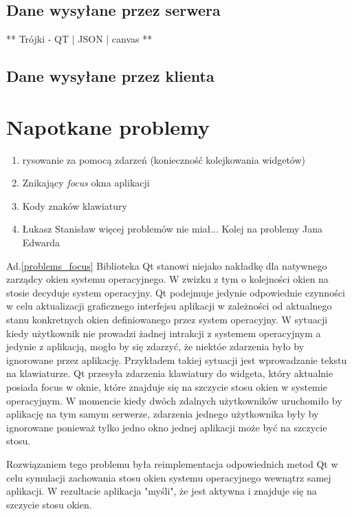 \documentclass[polish]{inz}
\begin{document}
\subsection{Dane wysyłane przez serwera}

** Trójki - QT | JSON | canvas **

\subsection{Dane wysyłane przez klienta}

\section{Napotkane problemy}
\begin{enumerate}
  \item rysowanie za pomocą zdarzeń (konieczność kolejkowania widgetów)
  \item Znikający \emph{focus} okna aplikacji
  \label{problems_focus}
  \item Kody znaków klawiatury
  \label{problems_keyboard}
  \item Łukasz Stanisław więcej problemów nie miał... Kolej na problemy Jana Edwarda
\end{enumerate}

Ad.\ref{problems_focus} Biblioteka Qt stanowi niejako nakładkę dla natywnego zarządcy okien systemu operacyjnego. W zwizku z tym o kolejności okien na stosie decyduje system operacyjny. Qt podejmuje jedynie odpowiednie czynności w celu aktualizacji graficznego interfejsu aplikacji w zależności od aktualnego stanu konkretnych okien definiowanego przez system operacyjny. W sytuacji kiedy użytkownik nie prowadzi żadnej intrakcji z systemem operacyjnym a jedynie z aplikacją, mogło by się zdarzyć, że niektóe zdarzenia było by ignorowane przez aplikację. Przykładem takiej sytuacji jest wprowadzanie tekstu na klawiaturze. Qt przesyła zdarzenia klawiatury do widgeta, który aktualnie posiada focus w oknie, które znajduje się na szczycie stosu okien w systemie operacyjnym. W momencie kiedy dwóch zdalnych użytkowników uruchomiło by aplikację na tym samym serwerze, zdarzenia jednego użytkownika były by ignorowane ponieważ tylko jedno okno jednej aplikacji może być na szczycie stosu. 

Rozwiązaniem tego problemu była reimplementacja odpowiednich metod Qt w celu symulacji zachowania stosu okien systemu operacyjnego wewnątrz samej aplikacji. W rezultacie aplikacja "myśli", że jest aktywna i znajduje się na szczycie stosu okien.
\end{document}
